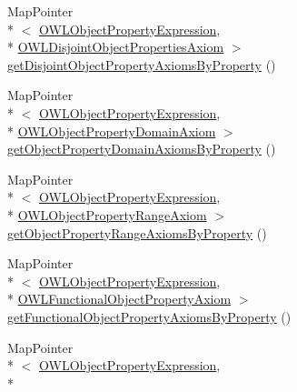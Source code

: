 \begin{DoxyCompactItemize}
\item 
Map\-Pointer\\*
$<$ \hyperlink{interfaceorg_1_1semanticweb_1_1owlapi_1_1model_1_1_o_w_l_object_property_expression}{O\-W\-L\-Object\-Property\-Expression}, \\*
\hyperlink{interfaceorg_1_1semanticweb_1_1owlapi_1_1model_1_1_o_w_l_disjoint_object_properties_axiom}{O\-W\-L\-Disjoint\-Object\-Properties\-Axiom} $>$ \hyperlink{classuk_1_1ac_1_1manchester_1_1cs_1_1owl_1_1owlapi_1_1_abstract_internals_impl_a9fada0ebc373262b5deb81885312052e}{get\-Disjoint\-Object\-Property\-Axioms\-By\-Property} ()
\item 
Map\-Pointer\\*
$<$ \hyperlink{interfaceorg_1_1semanticweb_1_1owlapi_1_1model_1_1_o_w_l_object_property_expression}{O\-W\-L\-Object\-Property\-Expression}, \\*
\hyperlink{interfaceorg_1_1semanticweb_1_1owlapi_1_1model_1_1_o_w_l_object_property_domain_axiom}{O\-W\-L\-Object\-Property\-Domain\-Axiom} $>$ \hyperlink{classuk_1_1ac_1_1manchester_1_1cs_1_1owl_1_1owlapi_1_1_abstract_internals_impl_ac83d408cf9c687354163b3f150ff9e53}{get\-Object\-Property\-Domain\-Axioms\-By\-Property} ()
\item 
Map\-Pointer\\*
$<$ \hyperlink{interfaceorg_1_1semanticweb_1_1owlapi_1_1model_1_1_o_w_l_object_property_expression}{O\-W\-L\-Object\-Property\-Expression}, \\*
\hyperlink{interfaceorg_1_1semanticweb_1_1owlapi_1_1model_1_1_o_w_l_object_property_range_axiom}{O\-W\-L\-Object\-Property\-Range\-Axiom} $>$ \hyperlink{classuk_1_1ac_1_1manchester_1_1cs_1_1owl_1_1owlapi_1_1_abstract_internals_impl_ac7dcafd6f251381d99e2f66ab211b13e}{get\-Object\-Property\-Range\-Axioms\-By\-Property} ()
\item 
Map\-Pointer\\*
$<$ \hyperlink{interfaceorg_1_1semanticweb_1_1owlapi_1_1model_1_1_o_w_l_object_property_expression}{O\-W\-L\-Object\-Property\-Expression}, \\*
\hyperlink{interfaceorg_1_1semanticweb_1_1owlapi_1_1model_1_1_o_w_l_functional_object_property_axiom}{O\-W\-L\-Functional\-Object\-Property\-Axiom} $>$ \hyperlink{classuk_1_1ac_1_1manchester_1_1cs_1_1owl_1_1owlapi_1_1_abstract_internals_impl_a9a910d3c9e8c6c65b174bf1e4d973269}{get\-Functional\-Object\-Property\-Axioms\-By\-Property} ()
\item 
Map\-Pointer\\*
$<$ \hyperlink{interfaceorg_1_1semanticweb_1_1owlapi_1_1model_1_1_o_w_l_object_property_expression}{O\-W\-L\-Object\-Property\-Expression}, \\*

\end{DoxyCompactItemize}
